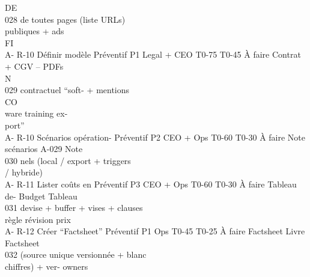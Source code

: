 \documentclass[12pt,landscape,a4paper]{article}
\begin{document}
\vspace{0.5em}
\vspace{0.5em}
\vspace{0.5em}
\vspace{0.5em}
DE\\
028         de toutes pages                                                       (liste URLs)\\
publiques + ads\\
\vspace{0.5em}
\vspace{0.5em}
\vspace{0.5em}
\vspace{0.5em}
FI\\
A- R-10     Définir modèle       Préventif P1   Legal + CEO T0-75 T0-45 À faire   Contrat + CGV –            PDFs\\
\vspace{0.5em}
\vspace{0.5em}
\vspace{0.5em}
\vspace{0.5em}
N\\
029         contractuel “soft-                                                    + mentions\\
\vspace{0.5em}
\vspace{0.5em}
CO\\
ware training ex-\\
port”\\
A- R-10     Scénarios opération- Préventif P2   CEO + Ops T0-60 T0-30 À faire     Note scénarios A-029       Note\\
030         nels (local / export                                                  + triggers\\
/ hybride)\\
A- R-11     Lister coûts en      Préventif P3   CEO + Ops T0-60 T0-30 À faire     Tableau de-     Budget     Tableau\\
031         devise + buffer +                                                     vises + clauses\\
règle révision prix\\
A- R-12     Créer “Factsheet” Préventif P1      Ops         T0-45 T0-25 À faire   Factsheet       Livre      Factsheet\\
032         (source unique                                                        versionnée +    blanc\\
chiffres) + ver-                                                      owners\\
\end{document}
